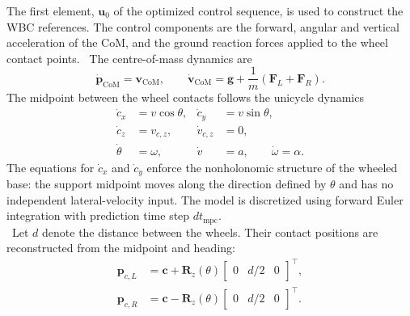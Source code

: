 %
The first element, $\mathbf{u}_0$ of the optimized control sequence, is used to construct the WBC
references. The control components are the forward, angular and vertical acceleration
of the CoM, and the ground reaction forces applied to the wheel contact points.
\
The centre-of-mass dynamics are
%
\begin{equation}
    \dot{\mathbf{p}}_{\mathrm{CoM}}
    =
    \mathbf{v}_{\mathrm{CoM}},
    \qquad
    \dot{\mathbf{v}}_{\mathrm{CoM}}
    =
    \mathbf{g}
    +
    \frac{1}{m}
    \left(
        \mathbf{F}_{L}
        +
        \mathbf{F}_{R}
    \right).
    \label{eq:dfcip_com_dynamics}
\end{equation}
%
The midpoint between the wheel contacts follows the unicycle dynamics
%
\begin{equation}
\begin{aligned}
    \dot{c}_x
        &=
        v\cos\theta, &
    \dot{c}_y
        &=
        v\sin\theta, \\
    \dot{c}_z
        &=
        v_{c,z}, &
    \dot{v}_{c,z}
        &=
        0, \\
    \dot{\theta}
        &=
        \omega, &
    \dot{v}
        &=
        a, \qquad
    \dot{\omega}
        =
        \alpha.
\end{aligned}
\label{eq:dfcip_unicycle_dynamics}
\end{equation}
%
The equations for $\dot{c}_x$ and $\dot{c}_y$ enforce the nonholonomic
structure of the wheeled base: the support midpoint moves along the direction
defined by $\theta$ and has no independent lateral-velocity input. The model is
discretized using forward Euler integration with prediction time step
$dt_{\mathrm{mpc}}$.\\
\
Let $d$ denote the distance between the wheels. Their contact positions are
reconstructed from the midpoint and heading:
%
\begin{equation}
\begin{aligned}
    \mathbf{p}_{c,L}
        &=
        \mathbf{c}
        +
        \mathbf{R}_{z}(\theta)
        \begin{bmatrix}
            0 & d/2 & 0
        \end{bmatrix}^{\top}, \\
    \mathbf{p}_{c,R}
        &=
        \mathbf{c}
        -
        \mathbf{R}_{z}(\theta)
        \begin{bmatrix}
            0 & d/2 & 0
        \end{bmatrix}^{\top}.
\end{aligned}
\label{eq:dfcip_contact_positions}
\end{equation}
